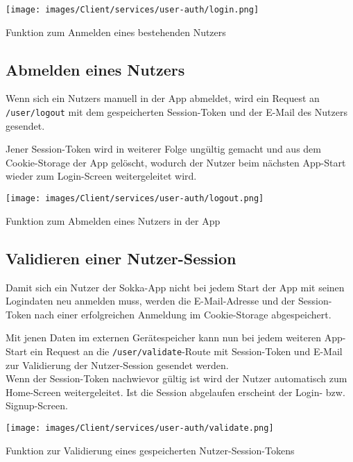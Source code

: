 \begin{code}
    \centering
    \texttt{[image: images/Client/services/user-auth/login.png]}
    \vspace{-25pt}
    \caption{Funktion zum Anmelden eines bestehenden Nutzers}
\end{code}

\subsection{Abmelden eines Nutzers}

Wenn sich ein Nutzers manuell in der App abmeldet, wird ein Request an \lstinline{/user/logout} mit
dem gespeicherten Session-Token und der E-Mail des Nutzers gesendet.

Jener Session-Token wird in weiterer Folge ungültig gemacht und aus dem Cookie-Storage der App
gelöscht, wodurch der Nutzer beim nächsten App-Start wieder zum Login-Screen weitergeleitet wird.

\begin{code}
    \centering
    \texttt{[image: images/Client/services/user-auth/logout.png]}
    \vspace{-25pt}
    \caption{Funktion zum Abmelden eines Nutzers in der App}
\end{code}

\subsection{Validieren einer Nutzer-Session}

Damit sich ein Nutzer der Sokka-App nicht bei jedem Start der App mit seinen Logindaten neu
anmelden muss, werden die E-Mail-Adresse und der Session-Token nach einer erfolgreichen Anmeldung
im Cookie-Storage abgespeichert.

Mit jenen Daten im externen Gerätespeicher kann nun bei jedem weiteren App-Start ein Request an die
\lstinline{/user/validate}-Route mit Session-Token und E-Mail zur Validierung der Nutzer-Session
gesendet werden.\\
Wenn der Session-Token nachwievor gültig ist wird der Nutzer automatisch zum Home-Screen weitergeleitet.
Ist die Session abgelaufen erscheint der Login- bzw. Signup-Screen.

\begin{code}
    \centering
    \texttt{[image: images/Client/services/user-auth/validate.png]}
    \vspace{-25pt}
    \caption{Funktion zur Validierung eines gespeicherten Nutzer-Session-Tokens}
\end{code}

